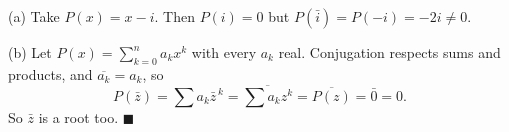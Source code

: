 (a) Take $P(x)=x-i$. Then $P(i)=0$ but $P(\bar i)=P(-i)=-2i\ne0$.

(b) Let $P(x)=\sum_{k=0}^n a_kx^k$ with every $a_k$ real. Conjugation respects sums and products, and $\overline{a_k}=a_k$, so
\[P(\bar z)=\sum a_k\bar z^{\,k}=\overline{\sum a_kz^k}=\overline{P(z)}=\bar0=0.\]
So $\bar z$ is a root too. $\blacksquare$
